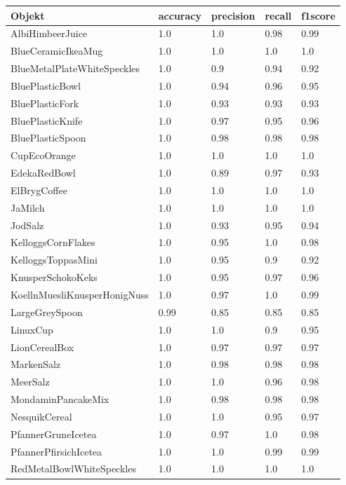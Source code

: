 \begin{table}
\centering
\small
{}
\begin{tabularx}{\textwidth}{Xllll}
\textbf{Objekt}	& \textbf{\gls{accuracy}} & \textbf{\gls{precision}}	& \textbf{\gls{recall}}	& \textbf{\gls{f1score}} \\ \hline
AlbiHimbeerJuice & 1.0 & 1.0 & 0.98 & 0.99 \\  
BlueCeramicIkeaMug & 1.0 & 1.0 & 1.0 & 1.0 \\  
BlueMetalPlateWhiteSpeckles & 1.0 & 0.9 & 0.94 & 0.92 \\  
BluePlasticBowl & 1.0 & 0.94 & 0.96 & 0.95 \\  
BluePlasticFork & 1.0 & 0.93 & 0.93 & 0.93 \\  
BluePlasticKnife & 1.0 & 0.97 & 0.95 & 0.96 \\  
BluePlasticSpoon & 1.0 & 0.98 & 0.98 & 0.98 \\  
CupEcoOrange & 1.0 & 1.0 & 1.0 & 1.0 \\  
EdekaRedBowl & 1.0 & 0.89 & 0.97 & 0.93 \\  
ElBrygCoffee & 1.0 & 1.0 & 1.0 & 1.0 \\  
JaMilch & 1.0 & 1.0 & 1.0 & 1.0 \\  
JodSalz & 1.0 & 0.93 & 0.95 & 0.94 \\  
KelloggsCornFlakes & 1.0 & 0.95 & 1.0 & 0.98 \\  
KelloggsToppasMini & 1.0 & 0.95 & 0.9 & 0.92 \\  
KnusperSchokoKeks & 1.0 & 0.95 & 0.97 & 0.96 \\  
KoellnMuesliKnusperHonigNuss & 1.0 & 0.97 & 1.0 & 0.99 \\  
LargeGreySpoon & 0.99 & 0.85 & 0.85 & 0.85 \\  
LinuxCup & 1.0 & 1.0 & 0.9 & 0.95 \\  
LionCerealBox & 1.0 & 0.97 & 0.97 & 0.97 \\  
MarkenSalz & 1.0 & 0.98 & 0.98 & 0.98 \\  
MeerSalz & 1.0 & 1.0 & 0.96 & 0.98 \\  
MondaminPancakeMix & 1.0 & 0.98 & 0.98 & 0.98 \\  
NesquikCereal & 1.0 & 1.0 & 0.95 & 0.97 \\  
PfannerGruneIcetea & 1.0 & 0.97 & 1.0 & 0.98 \\  
PfannerPfirsichIcetea & 1.0 & 1.0 & 0.99 & 0.99 \\  
RedMetalBowlWhiteSpeckles & 1.0 & 1.0 & 1.0 & 1.0 \\  

\end{tabularx}
\end{table}
